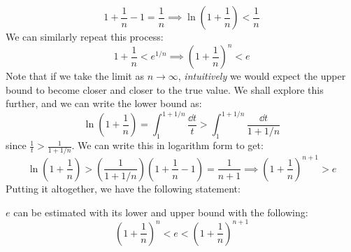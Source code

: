 \begin{itemize}
\begin{equation}
        1+\frac{1}{n}-1 = \frac{1}{n} \implies \ln\left(1+\frac{1}{n}\right) < \frac{1}{n}
        \label{eq:}
    \end{equation}
    We can similarly repeat this process:
    \begin{equation}
        1+\frac{1}{n} < e^{1/n} \implies (1+\frac{1}{n})^n < e
        \label{eq:}
    \end{equation}
    Note that if we take the limit as $n\to\infty$, \textit{intuitively} we would expect the upper bound to become closer and closer to the true value. We shall explore this further, and we can write the lower bound as:
    \begin{equation}
        \ln\left(1+\frac{1}{n}\right) = \int_{1}^{1+1/n} \frac{\dd{t}}{t} > \int_1^{1+1/n} \frac{\dd{t}}{1+1/n}
    \end{equation}
    since $\frac{1}{t}>\frac{1}{1+1/n}$. We can write this in logarithm form to get:
    \begin{equation}
        \ln\left(1+\frac{1}{n}\right)>\left(\frac{1}{1+1/n}\right)\left(1+\frac{1}{n}-1\right) = \frac{1}{n+1} \implies \left(1+\frac{1}{n}\right)^{n+1} > e
        \label{eq:}
    \end{equation}
    Putting it altogether, we have the following statement:
    \begin{idea}
        $e$ can be estimated with its lower and upper bound with the following:
        \begin{equation}
            \left(1+\frac{1}{n}\right)^n < e < \left(1+\frac{1}{n}\right)^{n+1}
        \end{equation}
    \end{idea}
\end{itemize}